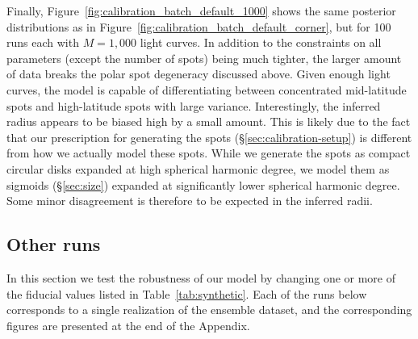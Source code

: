 \documentclass[modern,linenumbers]{aastex62}
\begin{document}
Finally, Figure~\ref{fig:calibration_batch_default_1000} shows
the same posterior distributions as in Figure~\ref{fig:calibration_batch_default_corner},
but for 100 runs each with $M=1{,}000$ light curves. In addition to the
constraints on all parameters (except the number of spots) being much
tighter, the larger amount of data breaks the polar spot degeneracy discussed
above. Given enough light curves, the model is capable of differentiating between
concentrated mid-latitude spots and high-latitude spots with large variance.
Interestingly, the inferred radius appears to be biased high by a small amount.
This is likely due to the fact that our prescription for
generating the spots (\S\ref{sec:calibration-setup}) is different from how
we actually model these spots. While we generate the spots as compact
circular disks expanded at high spherical harmonic degree, we model them
as sigmoids (\S\ref{sec:size}) expanded at significantly lower spherical
harmonic degree. Some minor disagreement is therefore to be expected in the inferred
radii.

\subsection{Other runs}
\label{sec:inference-other}
In this section we test the robustness of our model by changing one or
more of the fiducial values listed in Table~\ref{tab:synthetic}.
Each of the runs below corresponds to a single realization of the ensemble
dataset, and the corresponding figures are presented at the end of the Appendix.
\end{document}
